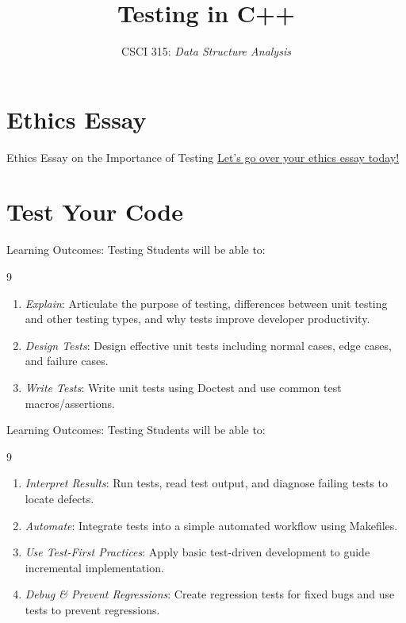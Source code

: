 \documentclass[14pt,aspectratio=1610]{beamer}
\title{\Huge{}Testing in {\ttfamily\bfseries C++}}
\subtitle{CSCI 315: \textit{Data Structure Analysis}}
\institute{Charleston Southern University}
\begin{document}
\begin{frame}
  \titlepage{}
\end{frame}

\section*{Ethics Essay}

\begin{frame}{Ethics Essay on the Importance of Testing}
\centering\Large
\href{https://github.com/csu-cs/CSCI-315-2026-Fall/blob/master/ethics/README.md}{Let's go over your ethics essay today!}
\end{frame}

\section{Test Your Code}

\begin{frame}{Learning Outcomes: Testing}
  Students will be able to:
  \begin{overlayarea}{\linewidth}{9\baselineskip}
    \begin{enumerate}
      \item \emph{Explain}: Articulate the purpose of testing, differences between unit testing and other testing types, and why tests improve developer productivity.
      \item \emph{Design Tests}: Design effective unit tests including normal cases, edge cases, and failure cases.
      \item \emph{Write Tests}: Write unit tests using Doctest and use common test macros/assertions.
    \end{enumerate}
  \end{overlayarea}
\end{frame}

\begin{frame}{Learning Outcomes: Testing}
  Students will be able to:
  \begin{overlayarea}{\linewidth}{9\baselineskip}

    \begin{enumerate}\addtocounter{enumi}{3}
      \item \emph{Interpret Results}: Run tests, read test output, and diagnose failing tests to locate defects.
      \item \emph{Automate}: Integrate tests into a simple automated workflow using Makefiles.
      \item \emph{Use Test-First Practices}: Apply basic test-driven development to guide incremental implementation.
      \item \emph{Debug \& Prevent Regressions}: Create regression tests for fixed bugs and use tests to prevent regressions.
    \end{enumerate}
\end{overlayarea}
\end{frame}
\end{document}
